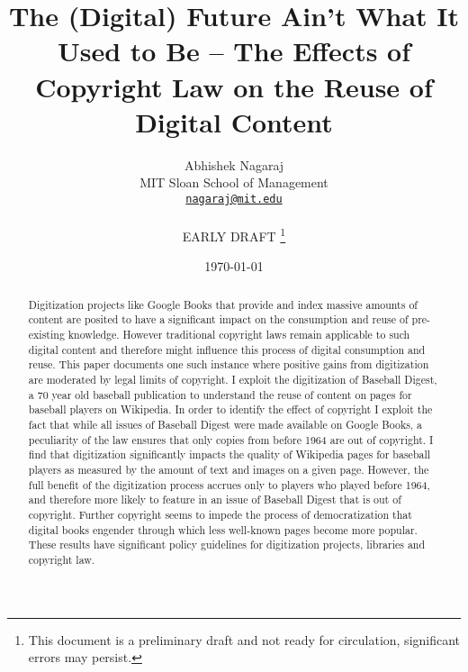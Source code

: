 \documentclass[12pt]{article}
\begin{document}
\setlength{\parskip}{4.5pt}

\baselineskip 18.5pt

\title{The (Digital) Future Ain't What It Used to Be -- The Effects of Copyright Law on the Reuse of Digital Content
}

\author{Abhishek Nagaraj\\
  MIT Sloan School of Management\\
        \href{mailto:nagaraj@mit.edu}{\texttt{nagaraj@mit.edu}}\\
        \\\color{red}EARLY DRAFT \footnote{This document is a preliminary draft and not ready for circulation, significant errors may persist.
}
}

\date{\today}


\maketitle

\begin{abstract}
Digitization projects like Google Books that provide and index massive amounts of content are posited to have a significant impact on the consumption and reuse of pre-existing knowledge. However traditional copyright laws remain applicable to such digital content and therefore might influence this process of digital consumption and reuse. This paper documents one such instance where positive gains from digitization are moderated by legal limits of copyright. I exploit the digitization of Baseball Digest, a 70 year old baseball publication to understand the reuse of content on pages for baseball players on Wikipedia. In order to identify the effect of copyright I exploit the fact that while all issues of Baseball Digest were made available on Google Books, a peculiarity of the law ensures that only copies from before 1964 are out of copyright. I find that digitization significantly impacts the quality of Wikipedia pages for baseball players as measured by the amount of text and images on a given page. However, the full benefit of the digitization process accrues only to players who played before 1964, and therefore more likely to feature in an issue of Baseball Digest that is out of copyright. Further copyright seems to impede the process of democratization that digital books engender through which less well-known pages become more popular. These results have significant policy guidelines for digitization projects, libraries and copyright law.
\end{abstract}
\end{document}
